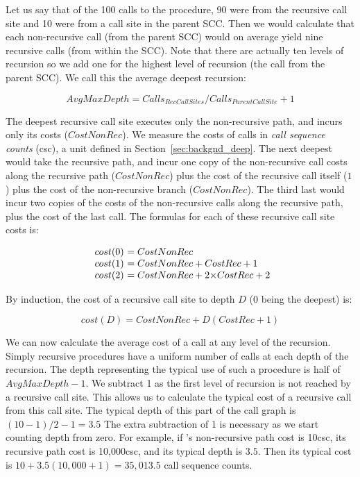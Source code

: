 Let us say that of the 100 calls to the procedure,
90 were from the recursive call site
and 10 were from a call site in the parent SCC.
Then we would calculate
that each non-recursive call
(from the parent SCC)
would on average yield nine recursive calls
(from within the SCC).
Note that there are actually ten levels of recursion so we add one for the
highest level of recursion (the call from the parent SCC).
We call this the average deepest recursion:

\begin{equation*}
AvgMaxDepth = Calls_{RecCallSites} / Calls_{ParentCallSite} + 1
\end{equation*}

The deepest recursive call site executes only the non-recursive path,
and incurs only its costs ($CostNonRec$).
We measure the costs of calls in \emph{call sequence counts} (csc),
a unit defined in Section~\ref{sec:backgnd_deep}.
The next deepest would take the recursive path,
and incur one copy of the non-recursive call costs along the recursive path
($CostNonRec$)
plus the cost of the recursive call itself ($1$)
plus the cost of the non-recursive branch ($CostNonRec$).
The third last would incur two copies of the costs
of the non-recursive calls along the recursive path,
plus the cost of the last call.
The formulas for each of these recursive call site costs is:

\[
\begin{array}{r @{}l @{}l}
cost(0)~&= CostNonRec \\
cost(1)~&= CostNonRec + CostRec + 1 \\
cost(2)~&= CostNonRec + 2{\times}CostRec + 2
\end{array}
\]

\noindent
By induction,
the cost of a recursive call site to depth $D$ (0 being the deepest)
is:

\begin{equation*}
cost(D) = CostNonRec + D(CostRec + 1)
\end{equation*}

We can now calculate the average cost of a call at any level of the
recursion.
Simply recursive procedures have a uniform number of calls at each depth of
the recursion.
The depth representing the typical use of such a procedure is half of
$AvgMaxDepth - 1$.
We subtract 1 as the first level of recursion is not reached by a recursive
call site.
This allows us to calculate the typical cost of a recursive call from this
call site.
The typical depth of this part of the call graph is $(10 - 1)/2 - 1 = 3.5$
The extra subtraction of 1 is necessary as we start counting depth from
zero.
For example, if \mapfoldl's non-recursive path cost is 10csc,
its recursive path cost is 10,000csc,
and its typical depth is $3.5$.
Then its typical cost is $10 + 3.5(10,000 + 1) = 35,013.5$ call sequence counts.

